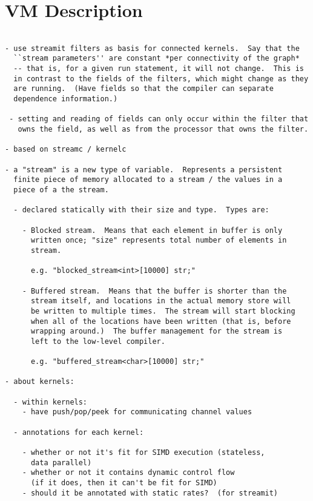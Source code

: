 \section{VM Description}

\begin{verbatim}

- use streamit filters as basis for connected kernels.  Say that the
  ``stream parameters'' are constant *per connectivity of the graph*
  -- that is, for a given run statement, it will not change.  This is
  in contrast to the fields of the filters, which might change as they
  are running.  (Have fields so that the compiler can separate
  dependence information.)

 - setting and reading of fields can only occur within the filter that
   owns the field, as well as from the processor that owns the filter.

- based on streamc / kernelc

- a "stream" is a new type of variable.  Represents a persistent
  finite piece of memory allocated to a stream / the values in a 
  piece of a the stream.

  - declared statically with their size and type.  Types are:

    - Blocked stream.  Means that each element in buffer is only
      written once; "size" represents total number of elements in
      stream.  

      e.g. "blocked_stream<int>[10000] str;"

    - Buffered stream.  Means that the buffer is shorter than the
      stream itself, and locations in the actual memory store will
      be written to multiple times.  The stream will start blocking
      when all of the locations have been written (that is, before
      wrapping around.)  The buffer management for the stream is
      left to the low-level compiler.

      e.g. "buffered_stream<char>[10000] str;"

- about kernels:

  - within kernels:
    - have push/pop/peek for communicating channel values

  - annotations for each kernel:

    - whether or not it's fit for SIMD execution (stateless,
      data parallel)
    - whether or not it contains dynamic control flow
      (if it does, then it can't be fit for SIMD)
    - should it be annotated with static rates?  (for streamit)


\end{verbatim}
